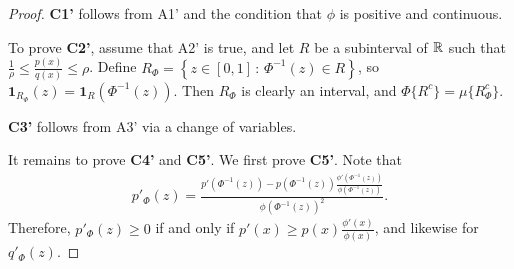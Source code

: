 \documentclass{article}
\begin{document}
\begin{proof}

\textbf{C1'} follows from A1' and the condition that $\phi$ is positive and continuous.

To prove \textbf{C2'}, assume that A2' is true, and let $R$ be a subinterval of ${\mathbb R}$ such that $\frac{1}{\rho} \leq \frac{p(x)}{q(x)} \leq \rho$. Define $R_{\Phi} = \left\{ z \in [0,1] \,:\, \Phi^{-1}(z) \in R \right\}$, so $\mathbf{1}_{R_\Phi}(z) = \mathbf{1}_R(\Phi^{-1}(z))$. Then $R_{\Phi}$ is clearly an interval, and $\Phi\{ R^c \} = \mu\{ R_{\Phi}^c \}$.
 
\textbf{C3'} follows from A3' via a change of variables. 

It remains to prove \textbf{C4'} and \textbf{C5'}. We first prove \textbf{C5'}. Note that 
\begin{align*}
p'_\Phi(z) = \frac{ p'(\Phi^{-1}(z))  - 
                     p(\Phi^{-1}(z)) \frac{\phi'(\Phi^{-1}(z))}{\phi(\Phi^{-1}(z))} }
           { \phi(\Phi^{-1}(z))^2}.
\end{align*}
Therefore, $p'_\Phi(z) \geq 0$ if and only if $p'(x) \geq p(x) \frac{\phi'(x)}{\phi(x)}$, and likewise for $q'_\Phi(z)$.


\end{proof}
\end{document}
